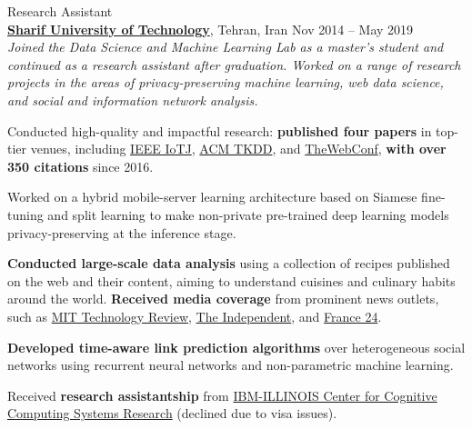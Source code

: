 \documentclass[10pt]{article}
\begin{document}
\begin{outerlist}
	\item {Research Assistant}\\
	\href{http://www.en.sharif.edu/}{\textbf{Sharif University of Technology}}, Tehran, Iran \hfill {Nov 2014 -- May 2019}\\
  \textit{Joined the {Data Science and Machine Learning Lab} as a master's student and continued as a research assistant after graduation. Worked on a range of research projects in the areas of privacy-preserving machine learning, web data science, and social and information network analysis.}

	\begin{innerlist}
    \item Conducted high-quality and impactful research: \textbf{published four papers} in top-tier venues, including \href{https://ieee-iotj.org/}{IEEE IoTJ}, \href{https://dl.acm.org/journal/tkdd}{ACM TKDD}, and \href{https://thewebconf.org/www2017/}{TheWebConf}, \textbf{with over 350 citations} since 2016.
		\item Worked on a hybrid mobile-server learning architecture based on Siamese fine-tuning and split learning to make non-private pre-trained deep learning models privacy-preserving at the inference stage.
		\item \textbf{Conducted large-scale data analysis} using a collection of recipes published on the web and their content, aiming to understand cuisines and culinary habits around the world. \textbf{Received media coverage} from prominent news outlets, such as \href{https://www.technologyreview.com/s/602790/how-data-mining-reveals-the-worlds-healthiest-cuisines/}{MIT Technology Review}, \href{https://www.indy100.com/article/healthy-diverse-top-healthiest-countries-cuisine-food-in-the-world-list-7412171}{The Independent}, and \href{https://www.france24.com/fr/20161115-algorithme-compare-cuisines-monde-matiere-dingredients-dapports-nutritionnels}{France 24}.
		\item \textbf{Developed time-aware link prediction algorithms} over heterogeneous social networks using recurrent neural networks and non-parametric machine learning.
		\item Received \textbf{research assistantship} from
    \href{https://www.c3sr.com/}{IBM-ILLINOIS Center for Cognitive Computing Systems Research} (declined due to visa issues).
	\end{innerlist}

\end{outerlist}
\end{document}
